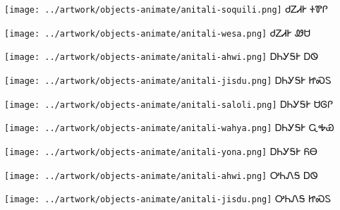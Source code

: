 \documentclass[avery5371]{flashcards}%
\begin{document}
\begin{flashcard}{
\texttt{[image: ../artwork/objects-animate/anitali-soquili.png]}
}\Huge ᏧᏃᏗᎨ ᏐᏈᎵ
\end{flashcard}

\begin{flashcard}{
\texttt{[image: ../artwork/objects-animate/anitali-wesa.png]}
}\Huge ᏧᏃᏗᎨ ᏪᏌ
\end{flashcard}

\begin{flashcard}{
\texttt{[image: ../artwork/objects-animate/anitali-ahwi.png]}
}\Huge ᎠᏂᎩᎦᎨ ᎠᏫ
\end{flashcard}

\begin{flashcard}{
\texttt{[image: ../artwork/objects-animate/anitali-jisdu.png]}
}\Huge ᎠᏂᎩᎦᎨ ᏥᏍᏚ
\end{flashcard}

\begin{flashcard}{
\texttt{[image: ../artwork/objects-animate/anitali-saloli.png]}
}\Huge ᎠᏂᎩᎦᎨ ᏌᎶᎵ
\end{flashcard}

\begin{flashcard}{
\texttt{[image: ../artwork/objects-animate/anitali-wahya.png]}
}\Huge ᎠᏂᎩᎦᎨ ᏩᎭᏯ
\end{flashcard}

\begin{flashcard}{
\texttt{[image: ../artwork/objects-animate/anitali-yona.png]}
}\Huge ᎠᏂᎩᎦᎨ ᏲᎾ
\end{flashcard}

\begin{flashcard}{
\texttt{[image: ../artwork/objects-animate/anitali-ahwi.png]}
}\Huge ᎤᏂᏁᎦ ᎠᏫ
\end{flashcard}

\begin{flashcard}{
\texttt{[image: ../artwork/objects-animate/anitali-jisdu.png]}
}\Huge ᎤᏂᏁᎦ ᏥᏍᏚ
\end{flashcard}
\end{document}
